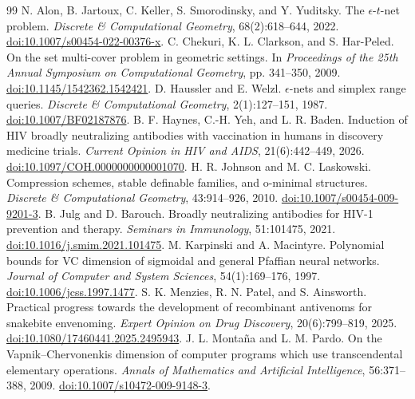 \documentclass[11pt,a4paper]{article}
\begin{document}
\clearpage
\begin{thebibliography}{99}
 N. Alon, B. Jartoux, C. Keller, S. Smorodinsky, and Y. Yuditsky. The $\epsilon$-$t$-net problem. \emph{Discrete \& Computational Geometry}, 68(2):618--644, 2022. \href{https://doi.org/10.1007/s00454-022-00376-x}{doi:10.1007/s00454-022-00376-x}.
 C. Chekuri, K. L. Clarkson, and S. Har-Peled. On the set multi-cover problem in geometric settings. In \emph{Proceedings of the 25th Annual Symposium on Computational Geometry}, pp. 341--350, 2009. \href{https://doi.org/10.1145/1542362.1542421}{doi:10.1145/1542362.1542421}.
 D. Haussler and E. Welzl. $\epsilon$-nets and simplex range queries. \emph{Discrete \& Computational Geometry}, 2(1):127--151, 1987. \href{https://doi.org/10.1007/BF02187876}{doi:10.1007/BF02187876}.
 B. F. Haynes, C.-H. Yeh, and L. R. Baden. Induction of HIV broadly neutralizing antibodies with vaccination in humans in discovery medicine trials. \emph{Current Opinion in HIV and AIDS}, 21(6):442--449, 2026. \href{https://doi.org/10.1097/COH.0000000000001070}{doi:10.1097/COH.0000000000001070}.
 H. R. Johnson and M. C. Laskowski. Compression schemes, stable definable families, and o-minimal structures. \emph{Discrete \& Computational Geometry}, 43:914--926, 2010. \href{https://doi.org/10.1007/s00454-009-9201-3}{doi:10.1007/s00454-009-9201-3}.
 B. Julg and D. Barouch. Broadly neutralizing antibodies for HIV-1 prevention and therapy. \emph{Seminars in Immunology}, 51:101475, 2021. \href{https://doi.org/10.1016/j.smim.2021.101475}{doi:10.1016/j.smim.2021.101475}.
 M. Karpinski and A. Macintyre. Polynomial bounds for VC dimension of sigmoidal and general Pfaffian neural networks. \emph{Journal of Computer and System Sciences}, 54(1):169--176, 1997. \href{https://doi.org/10.1006/jcss.1997.1477}{doi:10.1006/jcss.1997.1477}.
 S. K. Menzies, R. N. Patel, and S. Ainsworth. Practical progress towards the development of recombinant antivenoms for snakebite envenoming. \emph{Expert Opinion on Drug Discovery}, 20(6):799--819, 2025. \href{https://doi.org/10.1080/17460441.2025.2495943}{doi:10.1080/17460441.2025.2495943}.
 J. L. Monta\~na and L. M. Pardo. On the Vapnik--Chervonenkis dimension of computer programs which use transcendental elementary operations. \emph{Annals of Mathematics and Artificial Intelligence}, 56:371--388, 2009. \href{https://doi.org/10.1007/s10472-009-9148-3}{doi:10.1007/s10472-009-9148-3}.

\end{thebibliography}
\end{document}
